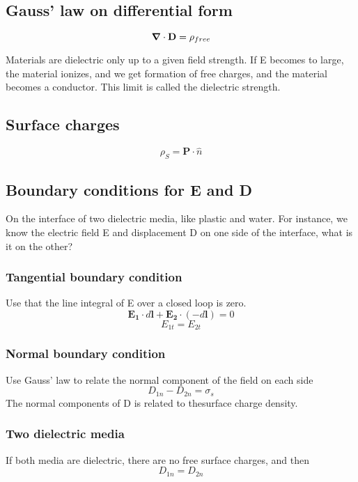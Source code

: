 \documentclass[
12pt, reprint, aip, onecolumn, notitlepage
]{revtex4-1}
\begin{document}
\subsection{Gauss' law on differential form}
\begin{equation}
	\grad \cdot \mathbf{D} = \rho_{free}
\end{equation}

Materials are dielectric only up to a given field strength. If E becomes to large, the material ionizes, and we get formation of free charges, and the material becomes a conductor. This limit is called the dielectric strength. 
\subsection{Surface charges}
\begin{equation}
	\rho_S = \mathbf{P}\cdot\hat{n}
\end{equation}

\subsection{Boundary conditions for E and D}
On the interface of two dielectric media, like plastic and water. For instance, we know the electric field E and displacement D on one side of the interface, what is it on the other? 
\subsubsection{Tangential boundary condition}
Use that the line integral of E over a closed loop is zero. 
\begin{equation}
	\mathbf{E_1}\cdot d\mathbf{l} + \mathbf{E_2}\cdot (-d\mathbf{l})= 0
\end{equation}
\begin{equation}
	E_{1t} = E_{2t}
\end{equation}

\subsubsection{Normal boundary condition}
Use Gauss' law to relate the normal component of the field on each side
\begin{equation}
	D_{1n}- D_{2n} = \sigma_s
\end{equation}
The normal components of D is related to thesurface charge density. 
\subsubsection{Two dielectric media}
If both media are dielectric, there are no free surface charges, and then 
\begin{equation}
	D_{1n} = D_{2n}
\end{equation}
\end{document}
